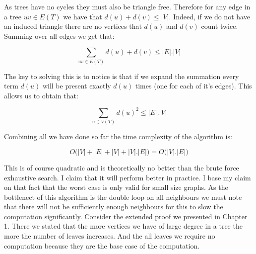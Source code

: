 As trees have no cycles they must also be triangle free. Therefore for any edge in a tree $uv \in E(T)$ we have that $d(u) + d(v) \le |V|$. Indeed, if we do not have an induced triangle there are no vertices that $d(u)$ and $d(v)$ count twice. Summing over all edges we get that:

$$ \sum_{uv \in E(T)}{d(u) + d(v)} \le |E|.|V| $$

The key to solving this is to notice is that if we expand the summation every term $d(u)$ will be present exactly $d(u)$ times (one for each of it's edges). This allows us to obtain that:

$$ \sum_{u \in V(T)}{d(u)^2} \le |E|.|V| $$

Combining all we have done so far the time complexity of the algorithm is:


$$ O\big( |V| + |E| + |V| + |V|.|E|  \big) = O\big(|V|.|E|\big) $$

This is of course quadratic and is theoretically no better than the brute force exhaustive search. I claim that it will perform better in practice. I base my claim on that fact that the worst case is only valid for small size graphs. As the bottlenect of this algorithm is the double loop on all neighbours we must note that there will not be sufficiently enough neighbours for this to slow the computation significantly. Consider the extended proof we presented in Chapter 1. There we stated that the more vertices we have of large degree in a tree the more the number of leaves increases. And the all leaves we require no computation because they are the base case of the computation.


\cite{parikh1980adaptive}
